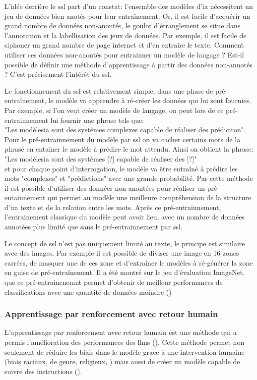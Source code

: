 L'idée derrière le \gls{ssl} part d'un constat: l'ensemble des modèles d'\gls{ia} nécessitent un jeu de données bien anotés pour leur entraînement. Or, il est facile d'acquérir un grand nombre de données non-anontés, le goulot d'étranglement se situe dans l'annotation et la labellisation des jeux de données. Par exemple, il est facile de siphoner un grand nombre de page internet et d'en extraire le texte. Comment utiliser ces données non-anontés pour entrainner un modèle de langage ? Est-il possible de définir une méthode d'apprentissage à partir des données non-annotés ? C'est précisement l'intérêt du \gls{ssl}.


Le fonctionnement du \gls{ssl} est relativement simple, dans une phase de pré-entraînement, le modèle va apprendre à ré-créer les données qui lui sont fournies. Par exemple, si l'on veut créer un modèle de langage, on peut lors de ce pré-entrainnement lui fournir une phrase tels que: \\
"Les modèles\gls{ia} sont des systèmes complexes capable de réaliser des prédiciton". \\
Pour le pré-entrainnement du modèle par \gls{ssl} on va cacher certains mots de la phrase en entainer le modèle à prédire le mot attendu. Ainsi on obtient la phrase: \\
"Les modèles\gls{ia} sont des systèmes [?] capable de réaliser des [?]" \\
et pour chaque point d'interrogation, le modèle va être entraîné à prédire les mots "complexes" et "prédictions" avec une grande probabilité. Par cette méthode il est possible d'utiliser des données non-anontées pour réaliser un pré-entainnement qui permet au modèle une meilleure compréhension de la structure d'un texte et de la relation entre les mots. Après ce pré-entrainnement, l'entrainement classique du modèle peut avoir lieu, avec un nombre de données annotées plus limité que sans le pré-entrainnement par \gls{ssl}.


Le concept de \gls{ssl} n'est pas uniquement limité au texte, le principe est similaire avec des images. Par exemple il est possible de diviser une image en 16 zones carrées, de masquer une de ces zone et d'entraîner le modèles à ré-générer la zone en guise de pré-entraînement. Il a été montré sur le jeu d'évaluation ImageNet, que ce pré-entrainenemnt permet d'obtenir de meilleur performances de classifications avec une quantité de données moindre (\cite{goyal_self-supervised_2021})

\subsubsection{Apprentissage par renforcement avec retour humain}
L'apprentissage par renforcement avec retour humain est une méthode qui a permis l'amélioration des performances des \gls{llms} (\cite{ziegler_fine-tuning_2020, stiennon_learning_2020}). Cette méthode permet non seulement de réduire les biais dans le modèle grace à une intervention humaine (biais raciaux, de genre, religieux, \cite{ganguli_red_2022}) mais aussi de créer un modèle capable de suivre des instructions (\cite{ouyang_training_2022}).

